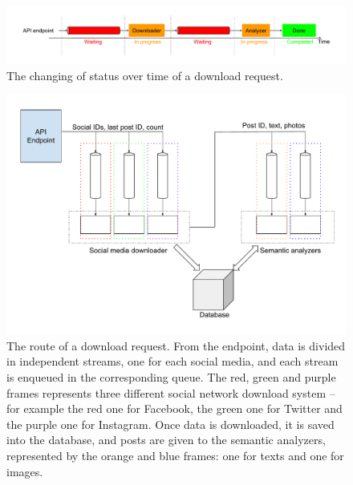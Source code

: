 \begin{figure}
\centering
\includegraphics[width=%
1\textwidth]{img/DownloadStatuses}
\caption{The changing of status over time of a download request.}
\label{fig:statuses}
\end{figure}

\begin{figure}
\centering
\includegraphics[width=%
1\textwidth]{img/Queues}
\caption{The route of a download request. From the endpoint, data is divided in independent streams, one for each social media, and each stream is enqueued in the corresponding queue. The red, green and purple frames represents three different social network download system -- for example the red one for Facebook, the green one for Twitter and the purple one for Instagram. Once data is downloaded, it is saved into the database, and posts are given to the semantic analyzers, represented by the orange and blue frames: one for texts and one for images.}
\label{fig:queues}
\end{figure}

